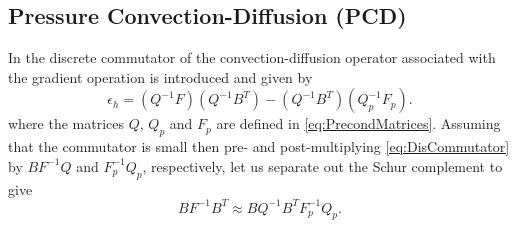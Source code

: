 


\subsection{Pressure Convection-Diffusion (PCD)}
\label{sec:PCD_outline}


In \cite[Chap. 8]{elman2005finite} the discrete commutator of the convection-diffusion operator associated with the gradient operation is introduced and given by
\begin{equation} \label{eq:DisCommutator}
    \epsilon_h = (Q^{-1}F)(Q^{-1}B^T)-(Q^{-1}B^T)(Q_p^{-1}F_p).
\end{equation}
where the matrices $Q$, $Q_p$ and $F_p$ are defined in  \eqref{eq:PrecondMatrices}. Assuming that the commutator is small then pre- and post-multiplying \eqref{eq:DisCommutator} by $B F^{-1} Q$ and $F_p^{-1}Q_p$, respectively, let us separate out the Schur complement to give
\begin{equation} \label{eq:SchurApprox}
    BF^{-1}B^T \approx B Q^{-1}B^T F_p^{-1} Q_p.
\end{equation}

